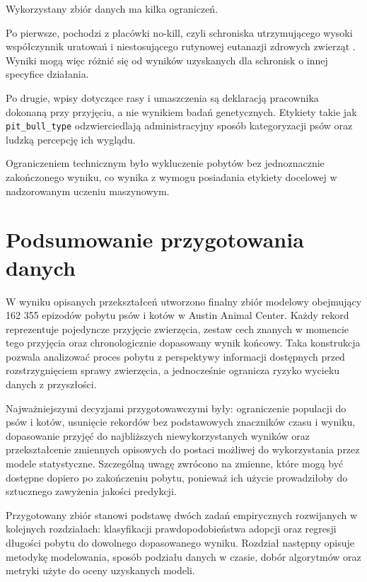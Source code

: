 Wykorzystany zbiór danych ma kilka ograniczeń.

Po pierwsze, pochodzi z placówki no-kill, czyli schroniska utrzymującego wysoki współczynnik uratowań i niestosującego rutynowej eutanazji zdrowych zwierząt \cite{Austin2010}. Wyniki mogą więc różnić się od wyników uzyskanych dla schronisk o innej specyfice działania.

Po drugie, wpisy dotyczące rasy i umaszczenia są deklaracją pracownika dokonaną przy przyjęciu, a nie wynikiem badań genetycznych. Etykiety takie jak \texttt{pit\_bull\_type} odzwierciedlają administracyjny sposób kategoryzacji psów oraz ludzką percepcję ich wyglądu.

Ograniczeniem technicznym było wykluczenie pobytów bez jednoznacznie zakończonego wyniku, co wynika z wymogu posiadania etykiety docelowej w nadzorowanym uczeniu maszynowym.

\section{Podsumowanie przygotowania danych}
\label{sec:podsumowanie-przygotowania-danych}

W wyniku opisanych przekształceń utworzono finalny zbiór modelowy obejmujący 162 355 epizodów pobytu psów i kotów w Austin Animal Center. Każdy rekord reprezentuje pojedyncze przyjęcie zwierzęcia, zestaw cech znanych w momencie tego przyjęcia oraz chronologicznie dopasowany wynik końcowy. Taka konstrukcja pozwala analizować proces pobytu z perspektywy informacji dostępnych przed rozstrzygnięciem sprawy zwierzęcia, a jednocześnie ogranicza ryzyko wycieku danych z przyszłości.

Najważniejszymi decyzjami przygotowawczymi były: ograniczenie populacji do psów i kotów, usunięcie rekordów bez podstawowych znaczników czasu i wyniku, dopasowanie przyjęć do najbliższych niewykorzystanych wyników oraz przekształcenie zmiennych opisowych do postaci możliwej do wykorzystania przez modele statystyczne. Szczególną uwagę zwrócono na zmienne, które mogą być dostępne dopiero po zakończeniu pobytu, ponieważ ich użycie prowadziłoby do sztucznego zawyżenia jakości predykcji.

Przygotowany zbiór stanowi podstawę dwóch zadań empirycznych rozwijanych w kolejnych rozdziałach: klasyfikacji prawdopodobieństwa adopcji oraz regresji długości pobytu do dowolnego dopasowanego wyniku. Rozdział następny opisuje metodykę modelowania, sposób podziału danych w czasie, dobór algorytmów oraz metryki użyte do oceny uzyskanych modeli.